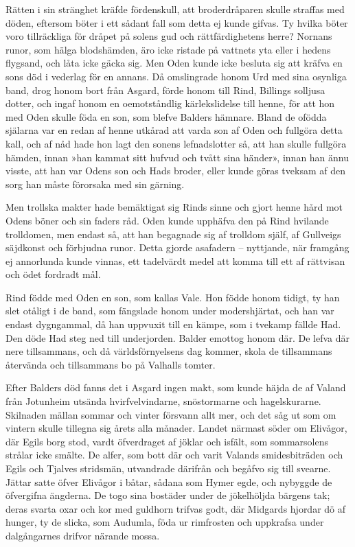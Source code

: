 Rätten i sin stränghet kräfde fördenskull, att broderdråparen skulle
straffas med döden, eftersom böter i ett sådant fall som detta ej kunde
gifvas. Ty hvilka böter voro tillräckliga för dråpet på solens gud och
rättfärdighetens herre? Nornans runor, som hälga blodshämden, äro icke
ristade på vattnets yta eller i hedens flygsand, och låta icke gäcka
sig. Men Oden kunde icke besluta sig att kräfva en sons död i vederlag
för en annans. Då omslingrade honom Urd med sina osynliga band, drog
honom bort från Asgard, förde honom till Rind, Billings solljusa dotter,
och ingaf honom en oemotståndlig kärlekslidelse till henne, för att hon
med Oden skulle föda en son, som blefve Balders hämnare. Bland de ofödda
själarna var en redan af henne utkårad att varda son af Oden och
fullgöra detta kall, och af nåd hade hon lagt den sonens lefnadslotter
så, att han skulle fullgöra hämden, innan »han kammat sitt hufvud och
tvått sina händer», innan han ännu visste, att han var Odens son och
Hads broder, eller kunde göras tveksam af den sorg han måste förorsaka
med sin gärning.

Men trollska makter hade bemäktigat sig Rinds sinne och gjort henne hård
mot Odens böner och sin faders råd. Oden kunde upphäfva den på Rind
hvilande trolldomen, men endast så, att han begagnade sig af trolldom
själf, af Gullveigs säjdkonst och förbjudna runor. Detta gjorde
asafadern -- nyttjande, när framgång ej annorlunda kunde vinnas, ett
tadelvärdt medel att komma till ett af rättvisan och ödet fordradt mål.



Rind födde med Oden en son, som kallas Vale. Hon födde honom tidigt, ty
han slet otåligt i de band, som fängslade honom under modershjärtat, och
han var endast dygngammal, då han uppvuxit till en kämpe, som i tvekamp
fällde Had. Den döde Had steg ned till underjorden. Balder emottog honom
där. De lefva där nere tillsammans, och då världsförnyelsens dag kommer,
skola de tillsammans återvända och tillsammans bo på Valhalls tomter.



Efter Balders död fanns det i Asgard ingen makt, som kunde häjda de af
Valand från Jotunheim utsända hvirfvelvindarne, snöstormarne och
hagelskurarne. Skilnaden mällan sommar och vinter försvann allt mer, och
det såg ut som om vintern skulle tillegna sig årets alla månader. Landet
närmast söder om Elivågor, där Egils borg stod, vardt öfverdraget af
jöklar och isfält, som sommarsolens strålar icke smälte. De alfer, som
bott där och varit Valands smidesbiträden och Egils och Tjalves
stridsmän, utvandrade därifrån och begåfvo sig till svearne. Jättar
satte öfver Elivågor i båtar, sådana som Hymer egde, och nybyggde de
öfvergifna ängderna. De togo sina bostäder under de jökelhöljda bärgens
tak; deras svarta oxar och kor med guldhorn trifvas godt, där Midgards
hjordar dö af hunger, ty de slicka, som Audumla, föda ur rimfrosten och
uppkrafsa under dalgångarnes drifvor närande mossa.


